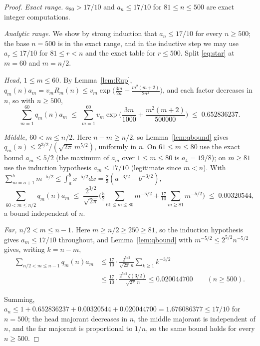 \documentclass[11pt,a4paper]{amsart}
\theoremstyle{plain}
\theoremstyle{definition}
\begin{document}
\begin{proof}
\emph{Exact range.} $a_{80}>17/10$ and $a_n \le 17/10$ for
$81 \le n \le 500$ are exact integer computations.

\emph{Analytic range.} We show by strong induction that $a_n \le 17/10$ for every
$n \ge 500$; the base $n=500$ is in the exact range, and in the inductive step we
may use $a_r \le 17/10$ for $81 \le r < n$ and the exact table for $r \le 500$.
Split \eqref{eq:star} at $m=60$ and $m=n/2$.

\emph{Head, $1 \le m \le 60$.} By Lemma~\ref{lem:Rup},
$q_m(n)a_m = v_m R_m(n) \le v_m\exp\!\big(\frac{3m}{2n}+\frac{m^2(m+2)}{2n^2}\big)$,
and each factor decreases in $n$, so with $n \ge 500$,
\[
  \sum_{m=1}^{60}q_m(n)a_m
  \;\le\; \sum_{m=1}^{60}v_m\exp\!\Big(\frac{3m}{1000}+\frac{m^2(m+2)}{500000}\Big)
  \;\le\; 0.652836237 .
\]

\emph{Middle, $60 < m \le n/2$.} Here $n-m \ge n/2$, so Lemma~\ref{lem:qbound}
gives $q_m(n) \le 2^{3/2}/(\sqrt{2\pi}\,m^{5/2})$, uniformly in $n$. On
$61 \le m \le 80$ use the exact bound $a_m \le 5/2$ (the maximum of $a_m$ over
$1 \le m \le 80$ is $a_4 = 19/8$); on $m \ge 81$ use the induction hypothesis
$a_m \le 17/10$ (legitimate since $m<n$). With
$\sum_{m=a+1}^{b} m^{-5/2}\le\int_a^b x^{-5/2}dx = \tfrac23(a^{-3/2}-b^{-3/2})$,
\[
  \sum_{60<m\le n/2}q_m(n)a_m
  \;\le\; \frac{2^{3/2}}{\sqrt{2\pi}}
     \Big(\tfrac52\!\!\sum_{61 \le m\le 80}\!\! m^{-5/2}
        + \tfrac{17}{10}\!\!\sum_{m\ge 81}\!\! m^{-5/2}\Big)
  \;\le\; 0.00320544 ,
\]
a bound independent of $n$.

\emph{Far, $n/2 < m \le n-1$.} Here $m \ge n/2 \ge 250 \ge 81$, so the induction
hypothesis gives $a_m \le 17/10$ throughout, and Lemma~\ref{lem:qbound} with
$m^{-5/2}\le 2^{5/2}n^{-5/2}$ gives, writing $k=n-m$,
\begin{align*}
  \sum_{n/2<m\le n-1}q_m(n)a_m
  &\le \frac{17}{10}\cdot\frac{2^{5/2}}{\sqrt{2\pi}\,n}
        \sum_{k\ge1}k^{-3/2} \\
  &\le \frac{17}{10}\cdot\frac{2^{5/2}\,\zeta(3/2)}{\sqrt{2\pi}\,n}
   \le 0.020044700 \qquad (n \ge 500).
\end{align*}

Summing, $a_n \le 1+0.652836237+0.00320544+0.020044700 = 1.676086377 \le 17/10$ for
$n=500$; the head majorant decreases in $n$, the middle majorant is independent
of $n$, and the far majorant is proportional to $1/n$, so the same bound holds
for every $n \ge 500$.
\end{proof}
\end{document}
